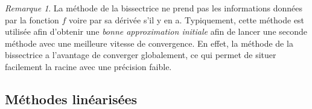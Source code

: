 \documentclass{article}
\theoremstyle{definition}
\theoremstyle{remark}
\newtheorem*{rmq}{Remarque}
\begin{document}
		\begin{rmq} La méthode de la bissectrice ne prend pas les informations données par la fonction $f$ voire par sa dérivée s'il y en a. Typiquement, cette
		méthode est utilisée afin d'obtenir une \emph{bonne approximation initiale} afin de lancer une seconde méthode avec une meilleure vitesse de
		convergence. En effet, la méthode de la bissectrice a l'avantage de converger globalement, ce qui permet de situer facilement la racine avec une
		précision faible.
		\end{rmq}

	\subsection{Méthodes linéarisées}
\end{document}
